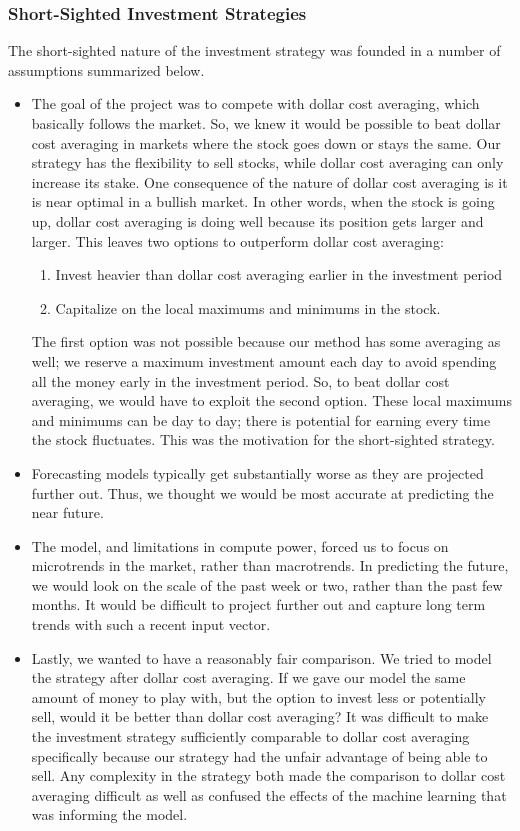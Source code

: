 \documentclass[12pt]{article}
\begin{document}
\subsubsection{Short-Sighted Investment Strategies}
The short-sighted nature of the investment strategy was founded in a number of assumptions summarized below.
\begin{itemize}
	\item The goal of the project was to compete with dollar cost averaging, which basically follows the market. So, we knew it would be possible to beat dollar cost averaging in markets where the stock goes down or stays the same. Our strategy has the flexibility to sell stocks, while dollar cost averaging can only increase its stake. One consequence of the nature of dollar cost averaging is it is near optimal in a bullish market. In other words, when the stock is going up, dollar cost averaging is doing well because its position gets larger and larger. This leaves two options to outperform dollar cost averaging:
	\begin{enumerate}
		\item Invest heavier than dollar cost averaging earlier in the investment period 
		\item Capitalize on the local maximums and minimums in the stock. 
	\end{enumerate}

	 The first option was not possible because our method has some averaging as well; we reserve a maximum investment amount each day to avoid spending all the money early in the investment period. So, to beat dollar cost averaging, we would have to exploit the second option. These local maximums and minimums can be day to day; there is potential for earning every time the stock fluctuates. This was the motivation for the short-sighted strategy.
	 
	 \item Forecasting models typically get substantially worse as they are projected further out. Thus, we thought we would be most accurate at predicting the near future. 
	 
	 \item The model, and limitations in compute power, forced us to focus on microtrends in the market, rather than macrotrends. In predicting the future, we would look on the scale of the past week or two, rather than the past few months. It would be difficult to project further out and capture long term trends with such a recent input vector.
	 
	 \item Lastly, we wanted to have a reasonably fair comparison. We tried to model the strategy after dollar cost averaging. If we gave our model the same amount of money to play with, but the option to invest less or potentially sell, would it be better than dollar cost averaging? It was difficult to make the investment strategy sufficiently comparable to dollar cost averaging specifically because our strategy had the unfair advantage of being able to sell. Any complexity in the strategy both made the comparison to dollar cost averaging difficult as well as confused the effects of the machine learning that was informing the model.
\end{itemize}
\end{document}
